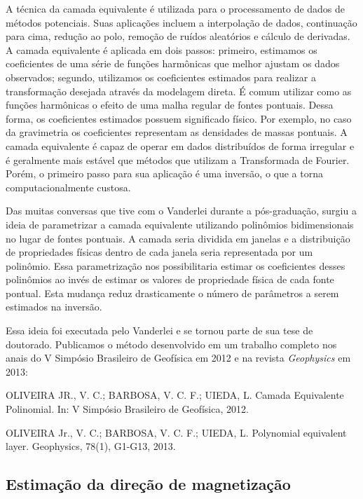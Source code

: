 A técnica da camada equivalente é utilizada para o processamento de dados de
métodos potenciais.
Suas aplicações incluem a interpolação de dados, continuação para cima, redução
ao polo, remoção de ruídos aleatórios e cálculo de derivadas.
A camada equivalente é aplicada em dois passos:
primeiro, estimamos os coeficientes de uma série de funções harmônicas que
melhor ajustam os dados observados;
segundo, utilizamos os coeficientes estimados para realizar a transformação
desejada através da modelagem direta.
É comum utilizar como as funções harmônicas o efeito de uma malha regular de
fontes pontuais.
Dessa forma, os coeficientes estimados possuem significado físico.
Por exemplo, no caso da gravimetria os coeficientes representam as densidades
de massas pontuais.
A camada equivalente é capaz de operar em dados distribuídos de forma irregular
e é geralmente mais estável que métodos que utilizam a Transformada de Fourier.
Porém, o primeiro passo para sua aplicação é uma inversão, o que a torna
computacionalmente custosa.

Das muitas conversas que tive com o Vanderlei durante a pós-graduação,
surgiu a ideia de parametrizar a camada equivalente utilizando polinômios
bidimensionais no lugar de fontes pontuais.
A camada seria dividida em janelas e a distribuição de propriedades físicas
dentro de cada janela seria representada por um polinômio.
Essa parametrização nos possibilitaria estimar os coeficientes desses
polinômios ao invés de estimar os valores de propriedade física de cada fonte
pontual.
Esta mudança reduz drasticamente o número de parâmetros a serem estimados na
inversão.

Essa ideia foi executada pelo Vanderlei e se tornou parte de sua tese de
doutorado.
Publicamos o método desenvolvido
em um trabalho completo nos anais do V Simpósio Brasileiro de Geofísica em 2012
e na revista \textit{Geophysics} em 2013:

\begin{displayquote}
    OLIVEIRA JR., V. C.; BARBOSA, V. C. F.; UIEDA, L.
    Camada Equivalente Polinomial. In: V Simpósio Brasileiro de Geofísica,
    2012.
\end{displayquote}

\begin{displayquote}
    OLIVEIRA Jr., V. C.; BARBOSA,  V. C. F.; UIEDA, L. Polynomial equivalent
    layer. Geophysics, 78(1), G1-G13, 2013.
\end{displayquote}



\subsection{Estimação da direção de magnetização}

